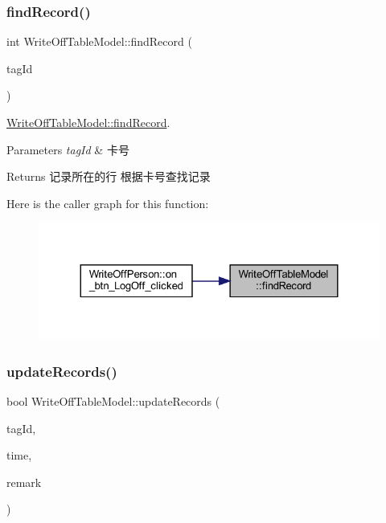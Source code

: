 \subsubsection{\texorpdfstring{findRecord()}{findRecord()}}
{\footnotesize\ttfamily int Write\+Off\+Table\+Model\+::find\+Record (\begin{DoxyParamCaption}\item[{const Q\+String \&}]{tag\+Id }\end{DoxyParamCaption})}



\mbox{\hyperlink{class_write_off_table_model_a7131d818db04f4bd4cc6aac041318741}{Write\+Off\+Table\+Model\+::find\+Record}}. 


\begin{DoxyParams}{Parameters}
{\em tag\+Id} & 卡号 \\
\hline
\end{DoxyParams}
\begin{DoxyReturn}{Returns}
记录所在的行 根据卡号查找记录 
\end{DoxyReturn}
Here is the caller graph for this function\+:
\nopagebreak
\begin{figure}[H]
\begin{center}
\leavevmode
\includegraphics[width=324pt]{class_write_off_table_model_a7131d818db04f4bd4cc6aac041318741_icgraph}
\end{center}
\end{figure}
\mbox{\label{class_write_off_table_model_a934ac0b55995b6259095f05b9546a08e}} 
\subsubsection{\texorpdfstring{updateRecords()}{updateRecords()}}
{\footnotesize\ttfamily bool Write\+Off\+Table\+Model\+::update\+Records (\begin{DoxyParamCaption}\item[{Q\+String \&}]{tag\+Id,  }\item[{Q\+String \&}]{time,  }\item[{Q\+String \&}]{remark }\end{DoxyParamCaption})}



